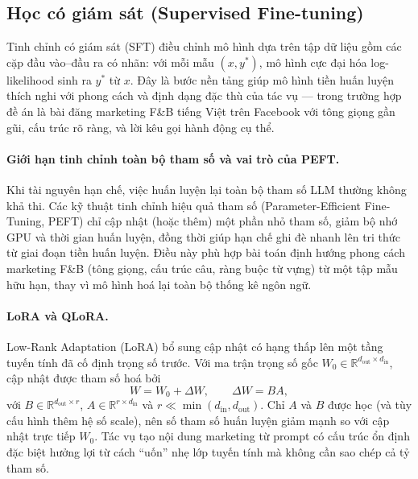 \subsection{Học có giám sát (Supervised Fine-tuning)}\label{subsec:sft}

Tinh chỉnh có giám sát (SFT) điều chỉnh mô hình dựa trên tập dữ liệu
gồm các cặp đầu vào--đầu ra có nhãn: với mỗi mẫu $(x, y^*)$, mô hình
cực đại hóa log-likelihood sinh ra $y^*$ từ $x$. Đây là bước nền tảng
giúp mô hình tiền huấn luyện thích nghi với phong cách và định dạng
đặc thù của tác vụ --- trong trường hợp đề án là bài đăng marketing
F\&B tiếng Việt trên Facebook với tông giọng gần gũi, cấu trúc rõ ràng,
và lời kêu gọi hành động cụ thể.

\paragraph{Giới hạn tinh chỉnh toàn bộ tham số và vai trò của PEFT.}
Khi tài nguyên hạn chế, việc huấn luyện lại toàn bộ tham số LLM
thường không khả thi. Các kỹ thuật tinh chỉnh hiệu quả tham
số (Parameter-Efficient Fine-Tuning, PEFT) chỉ cập nhật (hoặc thêm)
một phần nhỏ tham số, giảm bộ nhớ GPU và thời gian huấn luyện, đồng
thời giúp hạn chế ghi đè nhanh lên tri thức từ giai đoạn tiền huấn
luyện. Điều này phù hợp bài toán định hướng phong cách marketing F\&B
(tông giọng, cấu trúc câu, ràng buộc từ vựng) từ một tập mẫu hữu
hạn, thay vì mô hình hoá lại toàn bộ thống kê ngôn ngữ.

\paragraph{LoRA và QLoRA.}
Low-Rank Adaptation (LoRA) bổ sung cập nhật có hạng thấp lên
một tầng tuyến tính đã cố định trọng số trước. Với ma trận trọng số
gốc $W_0 \in \mathbb{R}^{d_{\mathrm{out}} \times d_{\mathrm{in}}}$,
cập nhật được tham số hoá bởi
\begin{equation}
    W = W_0 + \Delta W, \qquad
    \Delta W = B A,
\end{equation}
với $B \in \mathbb{R}^{d_{\mathrm{out}} \times r}$,
$A \in \mathbb{R}^{r \times d_{\mathrm{in}}}$ và
$r \ll \min(d_{\mathrm{in}}, d_{\mathrm{out}})$. Chỉ $A$ và $B$ được
học (và tùy cấu hình thêm hệ số scale), nên số tham số huấn luyện
giảm mạnh so với cập nhật trực tiếp $W_0$. Tác vụ tạo nội dung
marketing từ prompt có cấu trúc ổn định đặc biệt hưởng lợi từ cách
``uốn'' nhẹ lớp tuyến tính mà không cần sao chép cả tỷ tham số.

